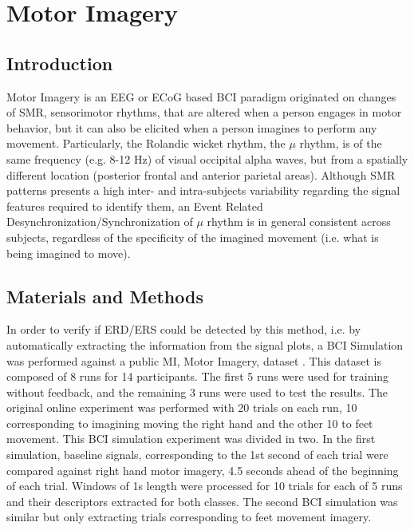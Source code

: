 \chapter{Motor Imagery}

\section{Introduction}

Motor Imagery is an EEG or ECoG based BCI paradigm originated on changes of SMR, sensorimotor rhythms, that are altered when a person engages in motor behavior, but it can also be elicited when a person imagines to perform any movement. Particularly, the Rolandic wicket rhythm, the $\mu$ rhythm, is of the same frequency (e.g. 8-12 Hz) of visual occipital alpha waves, but from a spatially different location (posterior frontal and anterior parietal areas)\cite{WolpawJonathanR2012}.   Although SMR patterns presents a high inter- and intra-subjects variability regarding the signal features required to identify them, an Event Related Desynchronization/Synchronization of $\mu$ rhythm is in general consistent across subjects, regardless of the specificity of the imagined movement (i.e. what is being imagined to move).

\section{Materials and Methods}

In order to verify if ERD/ERS could be detected by this method, i.e. by automatically extracting the information from the signal plots, a BCI Simulation was performed against a public MI, Motor Imagery, dataset \cite{Steyrl2015}.  This dataset is composed of 8 runs for 14 participants.  The first 5 runs were used for training without feedback, and the remaining 3 runs were used to test the results.  The original online experiment was performed with 20 trials on each run, 10 corresponding to imagining moving the right hand and the other 10 to feet movement.  This BCI simulation experiment was divided in two.  In the first simulation, baseline signals, corresponding to the 1st second of each trial were compared against right hand motor imagery, 4.5 seconds ahead of the beginning of each trial. Windows of 1s length were processed for 10 trials for each of 5 runs and their descriptors extracted for both classes.  The second BCI simulation was similar but only extracting trials corresponding to feet movement imagery.

